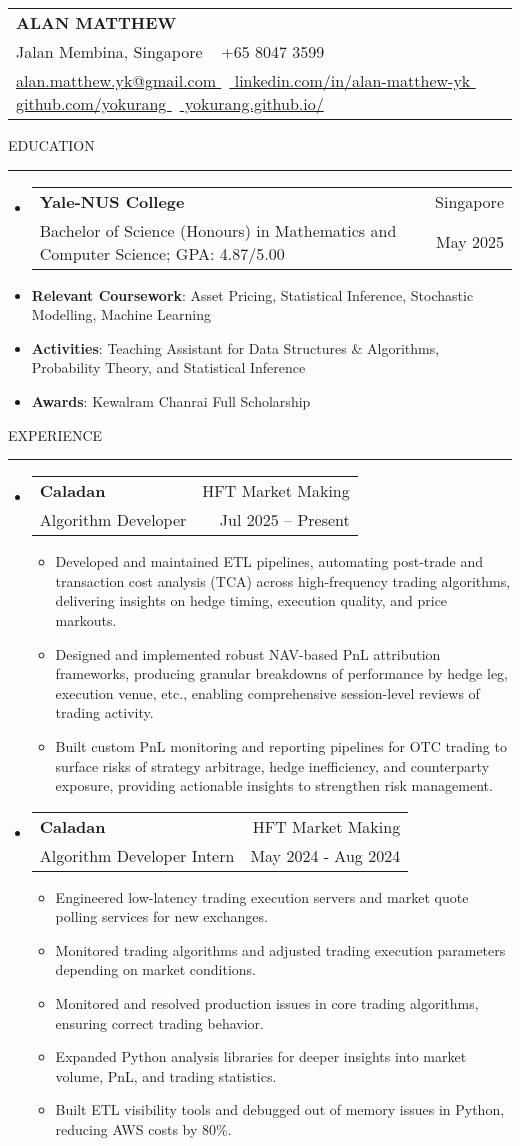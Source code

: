 \documentclass[letterpaper, 11pt]{article}
\makeatletter
\def\sectionlineskip{\medskip}
\def\sectionskip{\medskip}
\def\namesize{\LARGE}
\newcommand{\ResumeHeader}[6]{
  \noindent
  \begin{tabularx}{\textwidth}{>{\centering\arraybackslash}X}
    \namesize\MakeUppercase{\textbf{\fullname}} \\
    #1 \textbar\ #2 \\
    #3 \textbar\ #4 \textbar\ #5 \textbar\ #6 \\
  \end{tabularx}
}
\def \fullname { Alan Matthew }
\def \linkedinlink { https://www.linkedin.com/in/alan-matthew-yk }
\def \linkedintext { linkedin.com/in/alan-matthew-yk }
\def \phonenumber { +65 8047 3599 }
\def \githublink { https://github.com/yokurang }
\def \githubtext { github.com/yokurang }
\def \emaillink { mailto:alan.matthew.yk@gmail.com }
\def \emailtext { alan.matthew.yk@gmail.com }
\def \websitelink { https://yokurang.github.io/ }
\def \websitetext { yokurang.github.io/ }
\def \address { 9 Jalan Membina, Singapore }
\def \headertype {\ResumeHeader}
\def \linkedin {\href{\linkedinlink}{\linkedintext}}
\def \phone {{\phonenumber}}
\def \email {\href{\emaillink}{\emailtext}}
\def \github {\href{\githublink}{\githubtext}}
\def \website {\href{\websitelink}{\websitetext}}
\newcommand{\SectionHeading}[1]{
  \sectionskip
  \raggedright\raggedbottom\MakeUppercase{\large{#1}}
  \sectionlineskip
  \hrule
  \color{black}
}
\newcommand{\ResumeEntryTSDL}[4]{
  \vspace{1pt}\item
    \begin{tabular*}{\textwidth}[t]{l@{\extracolsep{\fill}}r} 
      \textbf{#1} & #2 \\
      #3 & #4 \\
    \end{tabular*}\vspace{-2.835pt} %
}
\newcommand{\ResumeItem}[2]{
  \item{
    \textbf{#1}{: #2 \vspace{-2.835pt}}
  }
}
\newcommand{\ResumeItemDefault}[1]{
  \item{
    #1 \vspace{-2.835pt}
  }
}
\newcommand{\ResumeSubItem}[2]{\ResumeItem{#1}{#2}\vspace{-2.835pt}}
\newcommand{\ResumeEntryStart}{\begin{itemize}[leftmargin=0mm, label={}]}
\newcommand{\ResumeEntryEnd}{\end{itemize}\vspace{-2.835pt}} %
\newcommand{\ResumeItemListStart}{\begin{itemize}[leftmargin=5mm, label=$\bullet$, itemsep=1mm, parsep=1mm]} %
\newcommand{\ResumeItemListEnd}{\end{itemize}}
\makeatother
\begin{document}
  \headertype{\address}{\phone}{\email}{\linkedin}{\github}{\website}
  
  \SectionHeading{Education}
  \ResumeEntryStart
    \ResumeEntryTSDL{Yale-NUS College} {Singapore}
    {Bachelor of Science (Honours) in Mathematics and Computer Science; GPA: 4.87/5.00} {May 2025}
    \ResumeSubItem{Relevant Coursework}{Asset Pricing, Statistical Inference, Stochastic Modelling, Machine Learning}
    \ResumeSubItem{Activities}{Teaching Assistant for Data Structures \& Algorithms, Probability Theory, and Statistical Inference}
    \ResumeSubItem{Awards}{Kewalram Chanrai Full Scholarship}
  \ResumeEntryEnd

  \vspace{5pt}

  \SectionHeading{Experience}

  \ResumeEntryStart
  \ResumeEntryTSDL{Caladan}{HFT Market Making}{Algorithm Developer}{Jul 2025 – Present}
  \ResumeItemListStart
  \ResumeItemDefault{Developed and maintained ETL pipelines, automating post-trade and transaction cost analysis (TCA) across high-frequency trading algorithms, delivering insights on hedge timing, execution quality, and price markouts.}
  \ResumeItemDefault{Designed and implemented robust NAV-based PnL attribution frameworks, producing granular breakdowns of performance by hedge leg, execution venue, etc., enabling comprehensive session-level reviews of trading activity.}
  \ResumeItemDefault{Built custom PnL monitoring and reporting pipelines for OTC trading to surface risks of strategy arbitrage, hedge inefficiency, and counterparty exposure, providing actionable insights to strengthen risk management.}
  
  \ResumeItemListEnd
  \ResumeEntryEnd

  \ResumeEntryStart
  \ResumeEntryTSDL{Caladan}{HFT Market Making}{Algorithm Developer Intern}{May 2024 - Aug 2024}
  \ResumeItemListStart
  \ResumeItemDefault{Engineered low-latency trading execution servers and market quote polling services for new exchanges.}
  \ResumeItemDefault{Monitored trading algorithms and adjusted trading execution parameters depending on market conditions.}
  \ResumeItemDefault{Monitored and resolved production issues in core trading algorithms, ensuring correct trading behavior.}
  \ResumeItemDefault{Expanded Python analysis libraries for deeper insights into market volume, PnL, and trading statistics.}
  \ResumeItemDefault{Built ETL visibility tools and debugged out of memory issues in Python, reducing AWS costs by 80\%.}
  \ResumeItemListEnd
  \ResumeEntryEnd
\end{document}
